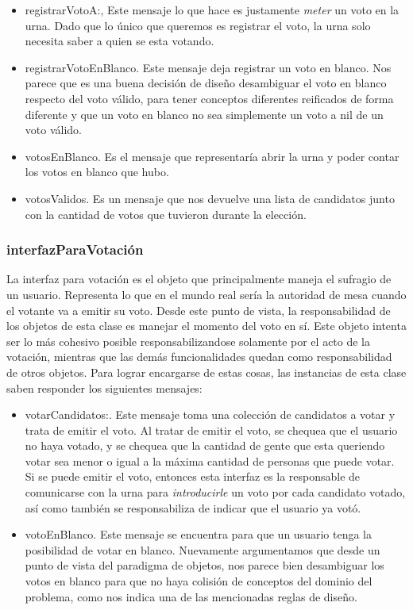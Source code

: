 \begin{itemize} 
\item registrarVotoA:, Este mensaje lo que hace es justamente \emph{meter} un voto en la urna. Dado que lo \'unico que queremos es registrar el voto, la urna solo necesita saber a quien se esta votando.
\item registrarVotoEnBlanco. Este mensaje deja registrar un voto en blanco. Nos parece que es una buena decisi\'on de diseño desambiguar el voto en blanco respecto del voto v\'alido, para tener conceptos diferentes reificados de forma diferente y que un voto en blanco no sea simplemente un voto a nil de un voto v\'alido.
\item votosEnBlanco. Es el mensaje que representar\'ia abrir la urna y poder contar los votos en blanco que hubo.
\item votosValidos. Es un mensaje que nos devuelve una lista de candidatos junto con la cantidad de votos que tuvieron durante la elecci\'on.
\end{itemize}


\subsubsection{interfazParaVotaci\'on}

La interfaz para votaci\'on es el objeto que principalmente maneja el sufragio de un usuario. Representa lo que en el mundo real ser\'ia la autoridad de mesa cuando el votante va a emitir su voto. Desde este punto de vista, la responsabilidad de los objetos de esta clase es manejar el momento del voto en s\'i. Este objeto intenta ser lo m\'as cohesivo posible responsabilizandose solamente por el acto de la votaci\'on, mientras que las dem\'as funcionalidades quedan como responsabilidad de otros objetos. Para lograr encargarse de estas cosas, las instancias de esta clase saben responder los siguientes mensajes:

\begin{itemize}
\item votarCandidatos:. Este mensaje toma una colecci\'on de candidatos a votar y trata de emitir el voto. Al tratar de emitir el voto, se chequea que el usuario no haya votado, y se chequea que la cantidad de gente que esta queriendo votar sea menor o igual a la m\'axima cantidad de personas que puede votar. Si se puede emitir el voto, entonces esta interfaz es la responsable de comunicarse con la urna para \emph{introducirle} un voto por cada candidato votado, as\'i como tambi\'en se responsabiliza de indicar que el usuario ya vot\'o.
\item votoEnBlanco. Este mensaje se encuentra para que un usuario tenga la posibilidad de votar en blanco. Nuevamente argumentamos que desde un punto de vista del paradigma de objetos, nos parece bien desambiguar los votos en blanco para que no haya colisi\'on de conceptos del dominio del problema, como nos indica una de las mencionadas reglas de dise\~{n}o.
\end{itemize}




